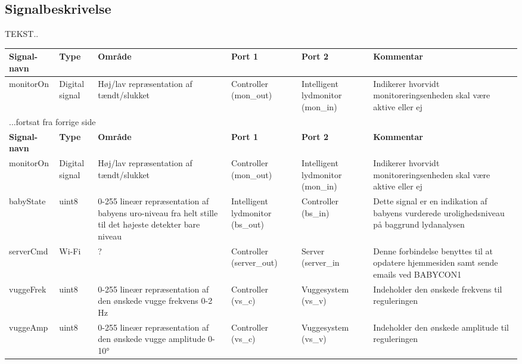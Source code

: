 

\subsection{Signalbeskrivelse}
TEKST..

\begin{center}
\label{table:Signaltabel}
\begin{longtable}{|p{2cm}|p{2cm}|p{2cm}|p{2cm}|p{2cm}|p{}|}
\hline
\textbf{Signal-navn}	&\textbf{Type} 		&\textbf{Område} &\textbf{Port 1} 	&\textbf{Port 2} 			&\textbf{Kommentar} \\ \hline

monitorOn 			&Digital signal  	&Høj/lav repræsentation af tændt/slukket 				
&Controller (mon\_out)		&Intelligent lydmonitor (mon\_in)			&Indikerer hvorvidt monitoreringsenheden skal være aktive eller ej					 \\\hline
\endfirsthead

\multicolumn{5}{l}{...fortsat fra forrige side} \\ \hline 
\textbf{Signal-navn}	&\textbf{Type} 		&\textbf{Område} &\textbf{Port 1} 	&\textbf{Port 2} 			&\textbf{Kommentar} \\ \hline

monitorOn 			&Digital signal  	&Høj/lav repræsentation af tændt/slukket 				
&Controller (mon\_out)		&Intelligent lydmonitor (mon\_in)			&Indikerer hvorvidt monitoreringsenheden skal være aktive eller ej					 \\\hline
\endhead


babyState 			&uint8				&0-255 lineær repræsentation af babyens uro-niveau fra helt stille til det højeste detekter bare niveau 	&Intelligent lydmonitor (bs\_out) &Controller (bs\_in)			&Dette signal er en indikation af babyens vurderede urolighedsniveau på baggrund lydanalysen		\\\hline

serverCmd 			&Wi-Fi				&?	 	&Controller (server\_out)  &Server (server\_in				
&Denne forbindelse benyttes til at opdatere hjemmesiden samt sende emails ved BABYCON1					\\\hline
					
vuggeFrek			&uint8				&0-255 lineær repræsentation af den ønskede vugge frekvens 0-2 Hz  	&Controller (vs\_c)  &Vuggesystem (vs\_v)		&Indeholder den ønskede frekvens til reguleringen 	    				\\\hline

vuggeAmp				&uint8 				&0-255 lineær repræsentation af den ønskede vugge amplitude 0-10°   &Controller (vs\_c)  &Vuggesystem (vs\_v)		&Indeholder den ønskede amplitude til reguleringen   				\\\hline


\end{longtable}
\end{center}
